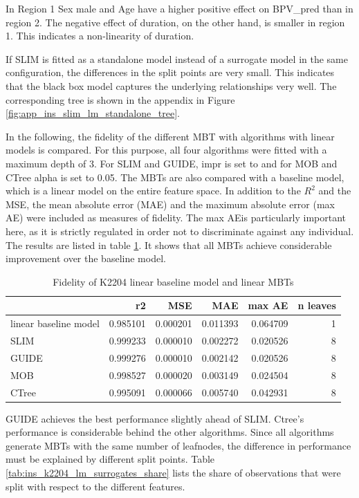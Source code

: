 In Region 1 Sex male and Age have a higher positive effect on  BPV\_pred than in region 2. The negative effect of duration, on the other hand, is smaller in region 1. This indicates a non-linearity of duration.

If SLIM is fitted as a standalone model instead of a surrogate model in the same configuration, the differences in the split points are very small. This indicates that the black box model captures the underlying relationships very well. The corresponding tree is shown in the appendix in Figure \ref{fig:app_ins_slim_lm_standalone_tree}.

In the following, the fidelity of the different MBT with algorithms with linear models is compared. For this purpose, all four algorithms were fitted with a maximum depth of 3. For SLIM and GUIDE, impr is set to and for MOB and CTree alpha is set to 0.05. The MBTs are also compared with a baseline model, which is a linear model on the entire feature space. In addition to the $R^2$ and the MSE, the mean absolute error (MAE) and the maximum absolute error (max AE) were included as measures of fidelity. The max AEis particularly important here, as it is strictly regulated in order not to discriminate against any individual. 
The results are listed in table \ref{tab:ins_k2204_lm_surrogates_perf}. It shows that all MBTs achieve considerable improvement over the baseline model.

\begin{table}[!htb]

\caption{Fidelity of K2204 linear baseline model and linear MBTs}
\centering
\begin{tabular}[t]{l|r|r|r|r|r}
\hline
  & r2 & MSE & MAE & max AE & n leaves\\
\hline
linear baseline model & 0.985101 & 0.000201 & 0.011393 & 0.064709 & 1\\
\hline
SLIM & 0.999233 & 0.000010 & 0.002272 & 0.020526 & 8\\
GUIDE & 0.999276 & 0.000010 & 0.002142 & 0.020526 & 8\\
MOB & 0.998527 & 0.000020 & 0.003149 & 0.024504 & 8\\
CTree & 0.995091 & 0.000066 & 0.005740 & 0.042931 & 8\\
\hline
\end{tabular}
\label{tab:ins_k2204_lm_surrogates_perf}
\end{table}

GUIDE achieves the best performance slightly ahead of SLIM. Ctree's performance is considerable behind the other algorithms.
Since all algorithms generate MBTs with the same number of leafnodes, the difference in performance must be explained by different split points.
Table \ref{tab:ins_k2204_lm_surrogates_share} lists the share of observations that were split with respect to the different features.

